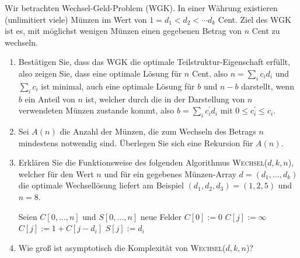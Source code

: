 
\begin{exercise}

Wir betrachten \glqq Wechsel-Geld-Problem \grqq (WGK).
In einer Währung existieren (unlimitiert viele) Münzen im Wert von $1 = d_1 < d_2 < \cdots  d_k$
Cent. Ziel des WGK ist es, mit möglichst wenigen Münzen einen gegebenen Betrag von $n$ Cent zu wechseln.
\begin{enumerate}[label = \alph*)]
  \item Bestätigen Sie, dass das WGK die optimale Teilstruktur-Eigenschaft erfüllt,
  also zeigen Sie, dass eine optimale Lösung für $n$ Cent, also $n = \sum_{i} c_i d_i$
  und $\sum_i c_i$ ist minimal, auch eine optimale Lösung für $b$ und $n - b$ darstellt,
  wenn $b$ ein Anteil von $n$ ist, welcher durch die in der Darstellung von $n$
  verwendeten Münzen zustande kommt, also $b = \sum_i c^{\prime}_i d_i$ mit $0 \leq c^{\prime}_i \leq c_i$.
  \item Sei $A(n)$ die Anzahl der Münzen, die zum Wechseln des Betrags $n$ mindestens notwendig sind.
  Überlegen Sie sich eine Rekursion für $A(n)$.
  \item Erklären Sie die Funktionsweise des folgenden Algorithmus \textsc{Wechsel}($d,k,n$),
  welcher für den Wert $n$ und für ein gegebenes Münzen-Array $d = (d_1,\dots,d_k)$
  die optimale Wechsellösung liefert am Beispiel $(d_1,d_2,d_3) = (1,2,5)$ und $n = 8$.
  \begin{algorithm}
      \begin{algorithmic}[1]
          \State Seien $C[0,\dots,n]$ und $S[0,\dots,n]$ neue Felder
          \State $C[0] := 0$
              \State $C[j] := \infty$
                      \State $C[j] := 1 + C[j - d_i]$
                      \State $S[j] := d_i$
                  \EndIf
              \EndFor
          \EndFor
          \EndProcedure
      \end{algorithmic}
  \end{algorithm}

\item Wie groß ist asymptotisch die Komplexität von \textsc{Wechsel}($d,k,n$)?
\end{enumerate}


\end{exercise}

